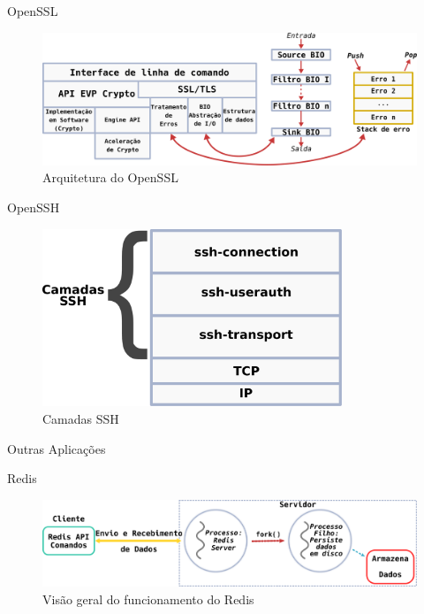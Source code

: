 \documentclass[xcolor={usenames,svgnames,dvipsnames},brazil,english,12pt,aspectratio=149]{beamer}
\begin{document}
\begin{frame}{OpenSSL}
  \begin{figure}[!h]
    \centering
    \includegraphics[width=\textwidth]{openssl_arch}
    \caption*{Arquitetura do OpenSSL}
  \end{figure}
\end{frame}

\begin{frame}{OpenSSH}
  \begin{figure}[!h]
    \centering
    \includegraphics[width=0.8\textwidth]{ssh_layers}
    \caption*{Camadas SSH}
  \end{figure}
\end{frame}

\begin{frame}{Outras Aplicações}
\end{frame}

\begin{frame}{Redis}
  \begin{figure}[!h]
    \centering
    \includegraphics[width=\textwidth]{redis_overview}
    \caption*{Visão geral do funcionamento do Redis}
  \end{figure}
\end{frame}
\end{document}
